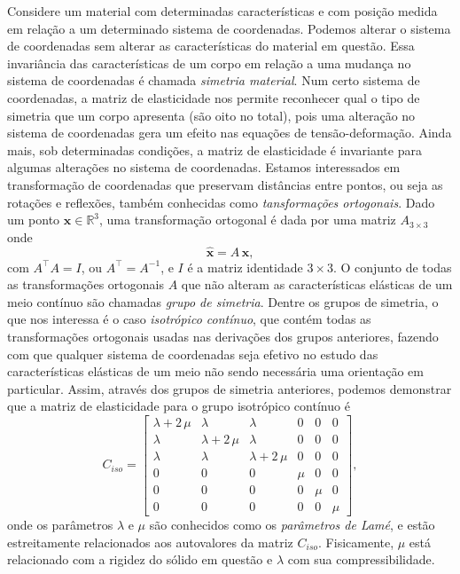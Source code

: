 Considere um material com determinadas caracter\'isticas e com posi\c{c}\~ao medida em rela\c{c}\~ao a um determinado sistema de coordenadas. Podemos alterar o sistema de coordenadas sem alterar as caracter\'isticas do material em quest\~ao. Essa invari\^ancia das caracter\'isticas de um corpo em rela\c{c}\~ao a uma mudan\c{c}a no sistema de coordenadas \'e chamada \textit{simetria material}. Num certo sistema de coordenadas, a matriz de elasticidade nos permite reconhecer qual o tipo de simetria que um corpo apresenta (s\~ao oito no total), pois uma altera\c{c}\~ao no sistema de coordenadas gera um efeito nas equa\c{c}\~oes de tens\~ao-deforma\c{c}\~ao.  Ainda mais, sob determinadas condi\c{c}\~oes, a matriz de elasticidade \'e invariante para algumas altera\c{c}\~oes no sistema de coordenadas.
Estamos interessados em transforma\c{c}\~ao de coordenadas que preservam dist\^ancias entre pontos, ou seja as rota\c{c}\~oes e reflex\~oes, tamb\'em conhecidas como \textit{tansforma\c{c}\~oes ortogonais}. Dado um ponto $\mathbf{x}\in\mathbb{R}^3$, uma transforma\c{c}\~ao ortogonal \'e dada por uma matriz $A_{3\times 3}$ onde 
\begin{equation*}
\mathbf{\hat{x}}=A\,\mathbf{x},
\end{equation*} 
com $A^\top A=I$, ou $A^\top=A^{-1}$, e $I$ \'e a matriz identidade $3\times 3$.
O conjunto de todas as transforma\c{c}\~oes ortogonais $A$ que n\~ao alteram as caracter\'isticas el\'asticas de um meio cont\'inuo s\~ao chamadas \textit{grupo de simetria}. Dentre os grupos de simetria, o que nos interessa \'e o caso \textit{isotr\'opico cont\'inuo}, que cont\'em todas as transforma\c{c}\~oes ortogonais usadas nas deriva\c{c}\~oes dos grupos anteriores, fazendo com que qualquer sistema de coordenadas seja efetivo no estudo das caracter\'isticas el\'asticas de um meio n\~ao sendo necess\'aria uma orienta\c{c}\~ao em particular. Assim, atrav\'es dos grupos de simetria anteriores, podemos demonstrar que a matriz de elasticidade para o grupo isotr\'opico cont\'inuo \'e
\begin{equation}
C_{iso}=
\begin{bmatrix}
\lambda +2\,\mu & \lambda & \lambda &0&0&0\\
\lambda&\lambda+2\,\mu&\lambda&0&0&0\\
\lambda&\lambda&\lambda+2\,\mu&0&0&0\\
0&0&0&\mu&0&0\\
0&0&0&0&\mu&0\\
0&0&0&0&0&\mu
\end{bmatrix},
\end{equation} 
onde os par\^ametros $\lambda$ e $\mu$ s\~ao conhecidos como os \textit{par\^ametros de Lam\'e}, e est\~ao estreitamente relacionados aos autovalores da matriz $C_{iso}$. Fisicamente, $\mu$ est\'a relacionado com a rigidez do s\'olido em quest\~ao e $\lambda$ com sua compressibilidade.

